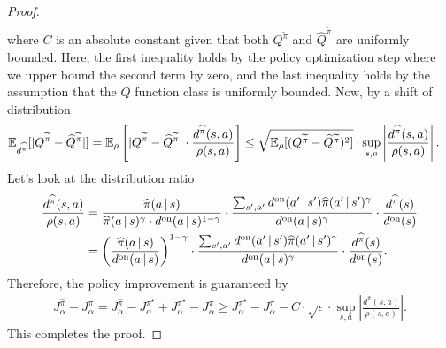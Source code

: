\begin{proof}
\begin{align*}
\end{align*}
where $C$ is an absolute constant given that both $Q^{\tilde\pi}$ and $\hat Q^{\tilde\pi}$ are uniformly bounded.
Here, the first inequality holds by the policy optimization step where we upper bound the second term by zero, and the last inequality holds by the assumption that the $Q$ function class is uniformly bounded.
Now, by a shift of distribution 
\begin{align*}
    \EE_{d^{\hat\pi}}[|\QFunc^{\tilde\pi} - \hat\QFunc^{\tilde\pi}|] 
        &= \EE_{\rho}\left[|\QFunc^{\tilde\pi} - \hat\QFunc^{\tilde\pi}|  \cdot \frac{d^{\hat\pi}(s, a)}{\rho(s, a)}\right]  %
        \le \sqrt{\EE_{\rho}[(\QFunc^{\tilde\pi} - \hat\QFunc^{\tilde\pi})^2]} \cdot \sup_{s, a} \left| \frac{d^{\hat\pi}(s, a)}{\rho(s, a)} \right|.
\end{align*}
Let's look at the distribution ratio 
\begin{align*}
    \frac{d^{\widehat\pi}(s, a)}{\rho(s, a)} &= \frac{{\widehat\pi}(a{\,|\,} s) }{\widehat\pi(a{\,|\,} s)^\gamma \cdot d^{\text{on}}(a{\,|\,} s)^{1-\gamma} }  \cdot \frac{\sum_{s', a'}d^{\text{on}}(a'{\,|\,} s') \widehat\pi(a'{\,|\,} s')^\gamma}{d^{\text{on}}(a{\,|\,} s)^\gamma} \cdot \frac{d^{\widehat\pi}(s)}{d^{\text{on}}(s)} \\ 
    &= \left(\frac{{\widehat\pi}(a{\,|\,} s)}{d^{\text{on}}(a{\,|\,} s)}\right)^{1-\gamma}  \cdot \frac{\sum_{s', a'}d^{\text{on}}(a'{\,|\,} s') \widehat\pi(a'{\,|\,} s')^\gamma}{d^{\text{on}}(a{\,|\,} s)^\gamma} \cdot \frac{d^{\widehat\pi}(s)}{d^{\text{on}}(s)}.
\end{align*}
Therefore, the policy improvement is guaranteed by 
\begin{align*}
    J_{\alpha}^{\hat\pi} - J_{\alpha}^{\tilde\pi} = J_{\alpha}^{\hat\pi} - J_{\alpha}^{\pi^\star} + J_{\alpha}^{\pi^\star} - J_{\alpha}^{\tilde\pi} \ge J_{\alpha}^{\pi^\star} - J_{\alpha}^{\tilde\pi} - C \cdot \sqrt \epsilon \cdot \sup_{s, a} \left| \frac{d^{\hat\pi}(s, a)}{\rho(s, a)} \right|.
\end{align*}
This completes the proof.














































\end{proof}




